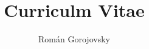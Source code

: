 \usepackage[activeacute]{babel}
\usepackage{fancyhdr}

\oddsidemargin 0in
\textwidth 6.2in
\topmargin 0in
\addtolength{\topmargin}{-.5in}
\textheight 9.6in
\setlength{\parindent}{0cm}
\pagestyle{fancy}

\title{Curriculm Vitae}
\author{Rom\'{a}n Gorojovsky}


